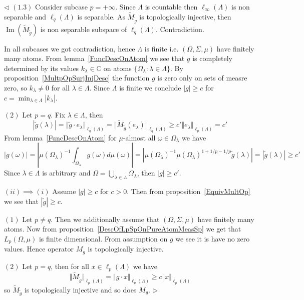 \documentclass[12pt]{article}
\newenvironment{proof}{\par $\triangleleft$}{$\triangleright$}
\begin{document}
\begin{proof}
    $(1.3)$ Consider subcase $p=+\infty$. Since $\Lambda$ is countable then
    $\ell_\infty(\Lambda)$ is non separable and $\ell_q(\Lambda)$ is separable.
    As $\widetilde{M}_{\widetilde{g}}$ is topologically injective,
    then $\operatorname{Im}(\widetilde{M}_{\widetilde{g}})$ is non separable
    subspace of $\ell_q(\Lambda)$. Contradiction.

    In all subcases we got contradiction, hence $\Lambda$ is finite i.e.
    $(\Omega,\Sigma,\mu)$ have finitely many atoms. From
    lemma~\ref{FuncDescOnAtom} we see that $g$ is completely determined by its
    values $k_\lambda\in\mathbb{C}$ on atoms
    $ \{\Omega_\lambda:\lambda\in\Lambda \}$. By
    proposition~\ref{MultpOpSurjInjDesc} the function $g$ is zero only on
    sets of measre zero, so $k_\lambda\neq 0$ for all $\lambda\in\Lambda$.
    Since $\Lambda$ is finite we conclude $|g|\geq c$
    for $c=\min_{\lambda\in\Lambda}|k_\lambda|$.


    $(2)$ Let $p=q$. Fix $\lambda\in\Lambda$, then
    $$
        |\widetilde{g}(\lambda)| =\Vert \widetilde{g}\cdot
        e_\lambda\Vert_{\ell_q(\Lambda)} =\Vert
        \widetilde{M}_{\widetilde{g}}(e_\lambda)\Vert_{\ell_q(\Lambda)} \geq
        c'\Vert e_\lambda\Vert_{\ell_p(\Lambda)} =c'
    $$
    From lemma~\ref{FuncDescOnAtom} for $\mu$-almost all
    $\omega\in\Omega_\lambda$ we have
    $$
        |g(\omega)|
        =\left|{\mu(\Omega_\lambda)}^{-1}\int_{\Omega_\lambda}
        g(\omega)d\mu(\omega)\right|
        =\left|{\mu(\Omega_\lambda)}^{-1}{\mu(\Omega_\lambda)}^{1+1/p-1/p}
        \widetilde{g}(\lambda)\right|
        =|\widetilde{g}(\lambda)|\geq c'
    $$
    Since $\lambda\in\Lambda$ is arbitrary and
    $\Omega=\bigcup_{\lambda\in\Lambda}\Omega_\lambda$, then $|g|\geq c'$.

    $(ii)\implies (i)$ Assume $|g|\geq c$ for $c>0$. Then from
    proposition~\ref{EquivMultOp} we see that $|\widetilde{g}|\geq c$.

    $(1)$ Let $p\neq q$. Then we additionally assume that $(\Omega,\Sigma,\mu)$
    have finitely many atoms. Now from
    proposition~\ref{DescOfLpSpOnPureAtomMeasSp} we get that $L_p(\Omega,\mu)$
    is finite dimensional. From assumption on $g$ we see it is have no zero
    values. Hence operator $M_g$ is topologically injective.

    $(2)$ Let $p=q$, then for all $x\in\ell_p(\Lambda)$ we have
    $$
        \Vert \widetilde{M}_{\widetilde{g}}\Vert_{\ell_p(\Lambda)}=\Vert g\cdot
        x\Vert_{\ell_p(\Lambda)}\geq c\Vert x\Vert_{\ell_p(\Lambda)}
    $$
    so $\widetilde{M}_{\widetilde{g}}$ is topologically injective and
    so does $M_g$.
\end{proof}
\end{document}
